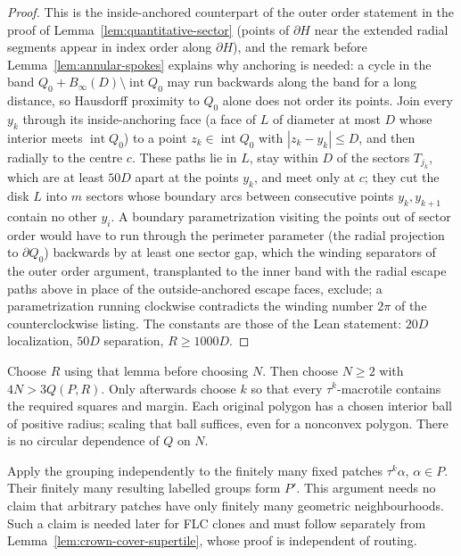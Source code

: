 \documentclass[11pt,a4paper]{article}
\theoremstyle{remark}
\begin{document}
\begin{proof}
This is the inside-anchored counterpart of the outer order statement in the
proof of Lemma~\ref{lem:quantitative-sector} (points of $\partial H$ near
the extended radial segments appear in index order along $\partial H$), and
the remark before Lemma~\ref{lem:annular-spokes} explains why anchoring is
needed: a cycle in the band $Q_0+B_\infty(D)\setminus\operatorname{int}Q_0$
may run backwards along the band for a long distance, so Hausdorff proximity
to $Q_0$ alone does not order its points.  Join every $y_k$ through its
inside-anchoring face (a face of $L$ of diameter at most $D$ whose interior
meets $\operatorname{int}Q_0$) to a point $z_k\in\operatorname{int}Q_0$ with
$|z_k-y_k|\le D$, and then radially to the centre $c$.  These paths lie in
$L$, stay within $D$ of the sectors $T_{j_k}$, which are at least $50D$
apart at the points $y_k$, and meet only at $c$; they cut the disk $L$ into
$m$ sectors whose boundary arcs between consecutive points $y_k,y_{k+1}$
contain no other $y_i$.  A boundary parametrization visiting the points out
of sector order would have to run through the perimeter parameter (the
radial projection to $\partial Q_0$) backwards by at least one sector gap,
which the winding separators of the outer order argument, transplanted to
the inner band with the radial escape paths above in place of the
outside-anchored escape faces, exclude; a parametrization running clockwise
contradicts the winding number $2\pi$ of the counterclockwise listing.  The
constants are those of the Lean statement: $20D$ localization, $50D$
separation, $R\ge1000D$.
\end{proof}

Choose $R$ using that lemma before choosing $N$.  Then choose $N\ge2$ with
$4N>3Q(P,R)$.  Only afterwards choose $k$ so that every $\tau^k$-macrotile
contains the required squares and margin.  Each original polygon has a
chosen interior ball of positive radius; scaling that ball suffices, even
for a nonconvex polygon.  There is no circular dependence of $Q$ on $N$.

Apply the grouping independently to the finitely many fixed patches
$\tau^k\alpha$, $\alpha\in P$.  Their finitely many resulting labelled
groups form $P'$.  This argument needs no claim that arbitrary patches have
only finitely many geometric neighbourhoods.  Such a claim is needed later
for FLC clones and must follow separately from
Lemma~\ref{lem:crown-cover-supertile}, whose proof is independent of routing.
\end{document}
